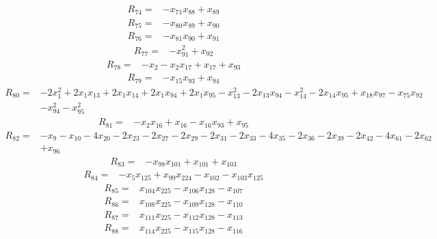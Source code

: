 \begin{align*}
 R_{74}={}&-x_{71}x_{88} +x_{89}
\end{align*}
\begin{align*}
 R_{75}={}&-x_{80}x_{89} +x_{90}
\end{align*}
\begin{align*}
 R_{76}={}&-x_{81}x_{90} +x_{91}
\end{align*}
\begin{align*}
 R_{77}={}&-x_{91}^{2} +x_{92}
\end{align*}
\begin{align*}
 R_{78}={}&-x_{2} -x_{2}x_{17} +x_{17} +x_{93}
\end{align*}
\begin{align*}
 R_{79}={}&-x_{15}x_{93} +x_{94}
\end{align*}
\begin{align*}
 R_{80}={}&-2x_{1}^{2} +2x_{1}x_{13} +2x_{1}x_{14} +2x_{1}x_{94} +2x_{1}x_{95} -x_{13}^{2} -2x_{13}x_{94} -x_{14}^{2} -2x_{14}x_{95} +x_{18}x_{97} -x_{75}x_{92}\\
 &-x_{94}^{2} -x_{95}^{2}
\end{align*}
\begin{align*}
 R_{81}={}&-x_{2}x_{16} +x_{16} -x_{16}x_{93} +x_{95}
\end{align*}
\begin{align*}
 R_{82}={}&-x_{9} -x_{10} -4x_{20} -2x_{23} -2x_{27} -2x_{29} -2x_{31} -2x_{33} -4x_{35} -2x_{36} -2x_{39} -2x_{42} -4x_{61} -2x_{62}\\
 &+x_{96}
\end{align*}
\begin{align*}
 R_{83}={}&-x_{98}x_{101} +x_{101} +x_{103}
\end{align*}
\begin{align*}
 R_{84}={}&-x_{5}x_{125} +x_{99}x_{224} -x_{102} -x_{103}x_{125}
\end{align*}
\begin{align*}
 R_{85}={}&x_{104}x_{225} -x_{106}x_{128} -x_{107}
\end{align*}
\begin{align*}
 R_{86}={}&x_{108}x_{225} -x_{109}x_{128} -x_{110}
\end{align*}
\begin{align*}
 R_{87}={}&x_{111}x_{225} -x_{112}x_{128} -x_{113}
\end{align*}
\begin{align*}
 R_{88}={}&x_{114}x_{225} -x_{115}x_{128} -x_{116}
\end{align*}
